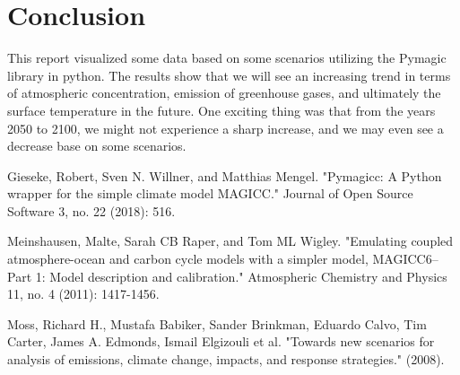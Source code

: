 \documentclass[12pt]{article}
\begin{document}
\section{Conclusion}
\label{lab:conclusion}
This report visualized some data based on some scenarios utilizing the Pymagic library in python. The results show that we will see an increasing trend in terms of atmospheric concentration, emission of greenhouse gases, and ultimately the surface temperature in the future.  One exciting thing was that from the years 2050 to 2100, we might not experience a sharp increase, and we may even see a decrease base on some scenarios.

\begin{thebibliography}{9}
Gieseke, Robert, Sven N. Willner, and Matthias Mengel. "Pymagicc: A Python wrapper for the simple climate model MAGICC." Journal of Open Source Software 3, no. 22 (2018): 516.

Meinshausen, Malte, Sarah CB Raper, and Tom ML Wigley. "Emulating coupled atmosphere-ocean and carbon cycle models with a simpler model, MAGICC6–Part 1: Model description and calibration." Atmospheric Chemistry and Physics 11, no. 4 (2011): 1417-1456.

Moss, Richard H., Mustafa Babiker, Sander Brinkman, Eduardo Calvo, Tim Carter, James A. Edmonds, Ismail Elgizouli et al. "Towards new scenarios for analysis of emissions, climate change, impacts, and response strategies." (2008).

\end{thebibliography}
\end{document}
